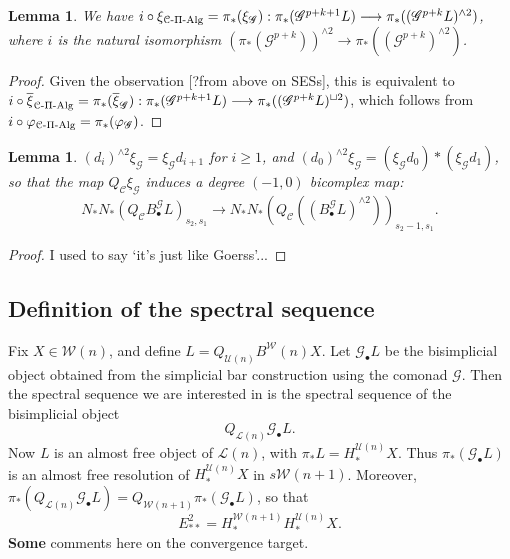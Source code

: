 \documentclass[11pt]{amsart}
\theoremstyle{plain}
\newtheorem{lem}[thm]{Lemma}
\theoremstyle{definition}
\let\phi\varphi
\renewcommand{\to}{\longrightarrow}
\newcommand{\scrQ}{\mathscr{Q}}
\newcommand{\scrR}{\mathscr{R}}
\newcommand{\scrT}{\mathscr{T}}
\newcommand{\scrY}{\mathscr{Y}}
\newcommand{\scrI}{\mathscr{I}}
\newcommand{\scrO}{\mathscr{O}}
\newcommand{\scrP}{\mathscr{P}}
\newcommand{\scrS}{\mathscr{S}}
\newcommand{\scrG}{\mathscr{G}}
\newcommand{\scrH}{\mathscr{H}}
\newcommand{\scrJ}{\mathscr{J}}
\newcommand{\scrK}{\mathscr{K}}
\newcommand{\scrL}{\mathscr{L}}
\newcommand{\scrZ}{\mathscr{Z}}
\newcommand{\scrN}{\mathscr{N}}
\newcommand{\scrM}{\mathscr{M}}
\newcommand{\calW}{\mathcal{W}}
\newcommand{\calU}{\mathcal{U}}
\newcommand{\calL}{\mathcal{L}}
\newcommand{\calC}{\mathcal{C}}
\theoremstyle{plain}
\newcommand{\BSW}{{\scrG}}%
\newcommand{\BSWres}{{\scrG_\bullet}}
\newcommand{\PiAlg}{\textup{-$\Pi$-Alg}}
\begin{document}
\begin{Composite functor spectral sequences}
\begin{lem}\label{LemmaOn xi}
We have $i\circ \xi_{\calC\PiAlg}=\pi_*(\xi_{\BSW}):\pi_*(\BSW^{p+k+1}L)\to\pi_*((\BSW^{p+k}L)^{\wedge 2})$, where $i$ is the natural isomorphism $(\pi_*(\BSW^{p+k}))^{\wedge 2}\to \pi_*((\BSW^{p+k})^{\wedge 2})$.
\end{lem}
\begin{proof}
Given the observation [?from above on SESs], this is equivalent to $i\circ \overline{\xi}_{\calC\PiAlg}=\pi_*(\overline{\xi}_{\BSW}):\pi_*(\BSW^{p+k+1}L)\to\pi_*((\BSW^{p+k}L)^{\sqcup 2})$, which follows from $i\circ\phi_{\calC\PiAlg}=\pi_*(\phi_{\BSW})$.
\end{proof}
%
%
%
%
%
%
%



\begin{lem}
$(d_i)^{\wedge 2}\xi_\BSW =\xi_\BSW d_{i+1}$ for $i\geq1$, and $(d_0)^{\wedge 2}\xi_\BSW = (\xi_\BSW d_{0})*(\xi_\BSW d_{1})$, so that the map $Q_{\calC}\xi_\BSW $ induces a degree $(-1,0)$ bicomplex map:
\[N_*N_*(Q_{\calC}B^\BSW_{\bullet}L)_{s_2,s_1}\to
  N_*N_*(Q_{\calC}((B^\BSW_{\bullet}L)^{\wedge 2}))_{s_2-1,s_1}.\]
\end{lem}
\begin{proof}
I used to say `it's just like Goerss'...
\end{proof}

\subsection{Definition of the spectral sequence}
Fix $X\in\calW(n)$, and define $L=Q_{\calU(n)}B^\calW(n)X$. Let $\BSWres L$ be the bisimplicial object obtained from the simplicial bar construction using the comonad $\BSW$. Then the spectral sequence we are interested in is the spectral sequence of the bisimplicial object
\[Q_{\calL(n)}\BSWres L.\]
Now $L$ is an almost free object of $\calL(n)$, with $\pi_*L=H_*^{\calU(n)}X$. Thus $\pi_*(\BSWres L)$ is an almost free resolution of $H_*^{\calU(n)}X$ in $s\calW(n+1)$. Moreover, $\pi_*(Q_{\calL(n)}\BSWres L)=Q_{\calW(n+1)}\pi_*(\BSWres L)$, so that
\[E^2_{**}=H_*^{\calW(n+1)}H_*^{\calU(n)}X.\]
\textbf{Some} comments here on the convergence target.


\end{Composite functor spectral sequences}
\end{document}
